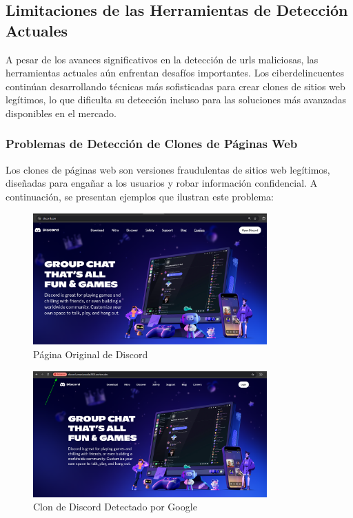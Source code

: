\subsection{Limitaciones de las Herramientas de Detección Actuales}

A pesar de los avances significativos en la detección de \glspl{url} maliciosas, las herramientas actuales aún enfrentan desafíos importantes. Los ciberdelincuentes continúan desarrollando técnicas más sofisticadas para crear clones de sitios web legítimos, lo que dificulta su detección incluso para las soluciones más avanzadas disponibles en el mercado.

\subsubsection{Problemas de Detección de Clones de Páginas Web}

Los clones de páginas web son versiones fraudulentas de sitios web legítimos, diseñadas para engañar a los usuarios y robar información confidencial. A continuación, se presentan ejemplos que ilustran este problema:





\begin{figure}[H]
    \centering
    \includegraphics[width=0.8\textwidth]{discordReal.png}
    \caption{Página Original de Discord}
    \label{fig:original-discord}
\end{figure}

\begin{figure}[H]
    \centering
    \includegraphics[width=0.8\textwidth]{discordFalso1.png}
    \caption{Clon de Discord Detectado por Google}
    \label{fig:google-detect-clone}
\end{figure}

